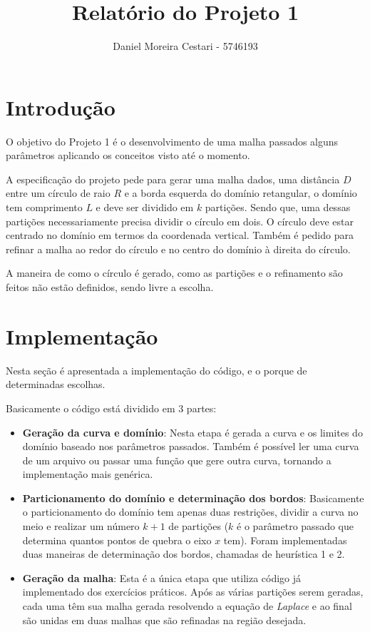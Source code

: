 \documentclass[a4paper]{article}
\title{Relatório do Projeto 1}
\author{Daniel Moreira Cestari - 5746193}
\begin{document}
\maketitle

\section{Introdução}

O objetivo do Projeto 1 é o desenvolvimento de uma malha passados alguns parâmetros aplicando os conceitos visto até o momento.

A especificação do projeto pede para gerar uma malha dados, uma distância $D$ entre um círculo de raio $R$ e a borda esquerda do domínio retangular, o domínio tem comprimento $L$ e deve ser dividido em $k$ partições. Sendo que, uma dessas partições necessariamente precisa dividir o círculo em dois. O círculo deve estar centrado no domínio em termos da coordenada vertical. Também é pedido para refinar a malha ao redor do círculo e no centro do domínio à direita do círculo.

A maneira de como o círculo é gerado, como as partições e o refinamento são feitos não estão definidos, sendo livre a escolha.


\section{Implementação}

Nesta seção é apresentada a implementação do código, e o porque de determinadas escolhas.

Basicamente o código está dividido em 3 partes:
\begin{itemize}
	\item \textbf{Geração da curva e domínio}: Nesta etapa é gerada a curva e os limites do domínio baseado nos parâmetros passados. Também é possível ler uma curva de um arquivo ou passar uma função que gere outra curva, tornando a implementação mais genérica.
	
	\item \textbf{Particionamento do domínio e determinação dos bordos}: Basicamente o particionamento do domínio tem apenas duas restrições, dividir a curva no meio e realizar um número $k+1$ de partições ($k$ é o parâmetro passado que determina quantos pontos de quebra o eixo $x$ tem).
	Foram implementadas duas maneiras de determinação dos bordos, chamadas de heurística 1 e 2.
	
	\item \textbf{Geração da malha}: Esta é a única etapa que utiliza código já implementado dos exercícios práticos. Após as várias partições serem geradas, cada uma têm sua malha gerada resolvendo a equação de \textit{Laplace} e ao final são unidas em duas malhas que são refinadas na região desejada.
	
\end{itemize}
\end{document}
